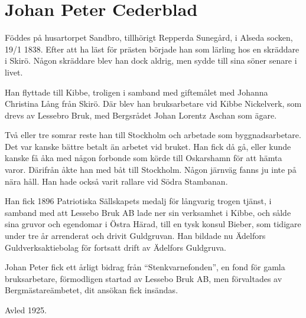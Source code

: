\chapter{Johan Peter Cederblad}
\label{johan_peter_cederblad}
Föddes på husartorpet Sandbro, tillhörigt Repperda Sunegård, i Alseda socken, 19/1 1838.
Efter att ha läst för prästen började han som lärling hos en skräddare i Skirö. Någon skräddare blev han dock aldrig, men sydde till sina söner senare i livet. 

Han flyttade till Kibbe, troligen i samband med giftemålet med Johanna Christina Lång från Skirö. Där blev han bruksarbetare vid Kibbe Nickelverk, som drevs av Lessebro Bruk, med Bergsrådet Johan Lorentz Aschan som ägare.

Två eller tre somrar reste han till Stockholm och arbetade som byggnadsarbetare.
Det var kanske bättre betalt än arbetet vid bruket. Han fick då gå, eller kunde kanske få åka med någon forbonde som körde till Oskarshamn för att hämta varor. Därifrån åkte han med båt till Stockholm. Någon järnväg fanns ju inte på nära håll. Han hade också varit rallare vid Södra Stambanan.

Han fick 1896 Patriotiska Sällskapets medalj för långvarig trogen tjänst, i samband med att Lessebo Bruk AB lade ner sin verksamhet i Kibbe, och sålde sina gruvor och egendomar i Östra Härad, till en tysk konsul Bieber, som tidigare under tre år arrenderat och drivit Guldgruvan. Han bildade nu Ädelfors Guldverksaktiebolag för fortsatt drift av Ädelfors Guldgruva. 

Johan Peter fick ett årligt bidrag från ``Stenkvarnefonden'', en fond för gamla bruksarbetare, förmodligen startad av Lessebo Bruk AB, men förvaltades av Bergmästareämbetet, dit ansökan fick insändas.

Avled 1925.